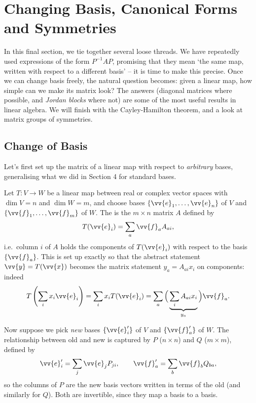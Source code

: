 \section{Changing Basis, Canonical Forms and Symmetries}

In this final section, we tie together several loose threads. We have repeatedly used expressions of the form $P^{-1}AP$, promising that they mean `the same map, written with respect to a different basis' -- it is time to make this precise. Once we can change basis freely, the natural question becomes: given a linear map, how simple can we make its matrix look? The answers (diagonal matrices where possible, and \emph{Jordan blocks} where not) are some of the most useful results in linear algebra. We will finish with the Cayley-Hamilton theorem, and a look at matrix groups of symmetries.

\subsection{Change of Basis}

Let's first set up the matrix of a linear map with respect to \emph{arbitrary} bases, generalising what we did in Section 4 for standard bases.

Let $T : V \rightarrow W$ be a linear map between real or complex vector spaces with $\dim V = n$ and $\dim W = m$, and choose bases $\{\vv{e}_1, \dots, \vv{e}_n\}$ of $V$ and $\{\vv{f}_1, \dots, \vv{f}_m\}$ of $W$. The  is the $m \times n$ matrix $A$ defined by
$$
T(\vv{e}_i) = \sum_{a} \vv{f}_a A_{ai},
$$
i.e.\ column $i$ of $A$ holds the components of $T(\vv{e}_i)$ with respect to the basis $\{\vv{f}_a\}$. This is set up exactly so that the abstract statement $\vv{y} = T(\vv{x})$ becomes the matrix statement $y_a = A_{ai}x_i$ on components: indeed
$$
T\left(\sum_i x_i \vv{e}_i\right) = \sum_i x_i T(\vv{e}_i) = \sum_a \Big(\underbrace{\sum_i A_{ai}x_i}_{y_a}\Big) \vv{f}_a.
$$

Now suppose we pick \emph{new} bases $\{\vv{e}_i'\}$ of $V$ and $\{\vv{f}_a'\}$ of $W$. The relationship between old and new is captured by  $P$ ($n \times n$) and $Q$ ($m \times m$), defined by
$$
\vv{e}_i' = \sum_j \vv{e}_j P_{ji}, \quad \quad \vv{f}_a' = \sum_b \vv{f}_b Q_{ba},
$$
so the columns of $P$ are the new basis vectors written in terms of the old (and similarly for $Q$). Both are invertible, since they map a basis to a basis.

